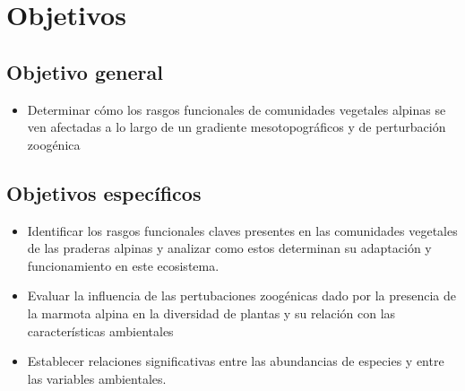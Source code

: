 \documentclass[
  letterpaper,
  DIV=11,
  numbers=noendperiod]{scrartcl}
\providecommand{\tightlist}{%
  \setlength{\itemsep}{0pt}\setlength{\parskip}{0pt}}\usepackage{longtable,booktabs,array}
\begin{document}
\hypertarget{objetivos}{%
\section{Objetivos}\label{objetivos}}

\hypertarget{objetivo-general}{%
\subsection{Objetivo general}\label{objetivo-general}}

\begin{itemize}
\tightlist
\item
  Determinar cómo los rasgos funcionales de comunidades vegetales
  alpinas se ven afectadas a lo largo de un gradiente mesotopográficos y
  de perturbación zoogénica
\end{itemize}

\hypertarget{objetivos-especuxedficos}{%
\subsection{Objetivos específicos}\label{objetivos-especuxedficos}}

\begin{itemize}
\item
  Identificar los rasgos funcionales claves presentes en las comunidades
  vegetales de las praderas alpinas y analizar como estos determinan su
  adaptación y funcionamiento en este ecosistema.
\item
  Evaluar la influencia de las pertubaciones zoogénicas dado por la
  presencia de la marmota alpina en la diversidad de plantas y su
  relación con las características ambientales
\item
  Establecer relaciones significativas entre las abundancias de especies
  y entre las variables ambientales.
\end{itemize}
\end{document}

